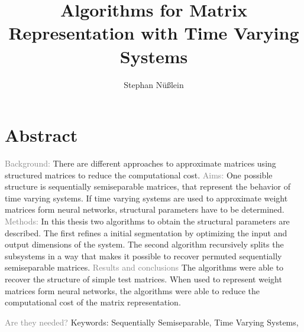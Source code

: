 \documentclass[doctype=mastersthesis,BCOR=15mm,biblatex]{ldvbook}%
\begin{document}
\title{Algorithms for Matrix Representation with Time Varying Systems}
%
\author{Stephan Nüßlein}


\maketitle[frontcover=Design1]


\chapter*{Abstract}
\textcolor{gray}{Background:}
There are different approaches to approximate matrices using structured matrices to reduce the computational cost.%
\textcolor{gray}{
Aims:}
One possible structure is sequentially semiseparable matrices, that represent the behavior of time varying systems.
If time varying systems are used to approximate weight matrices form neural networks, structural parameters have to be determined.
\textcolor{gray}{Methods:}
In this thesis two algorithms to obtain the structural parameters are described.
The first refines a initial segmentation by optimizing the input and output dimensions of the system.
The second algorithm recursively splits the subsystems in a way that makes it possible to recover permuted sequentially semiseparable matrices.
\textcolor{gray}{Results and conclusions}
The algorithms were able to recover the structure of simple test matrices.
When used to represent weight matrices form neural networks, the algorithms were able to reduce the computational cost of the matrix representation.

\vspace{3cm}

\textcolor{gray}{
Are they needed?
}
Keywords: Sequentially Semiseparable, Time Varying Systems,
\end{document}
